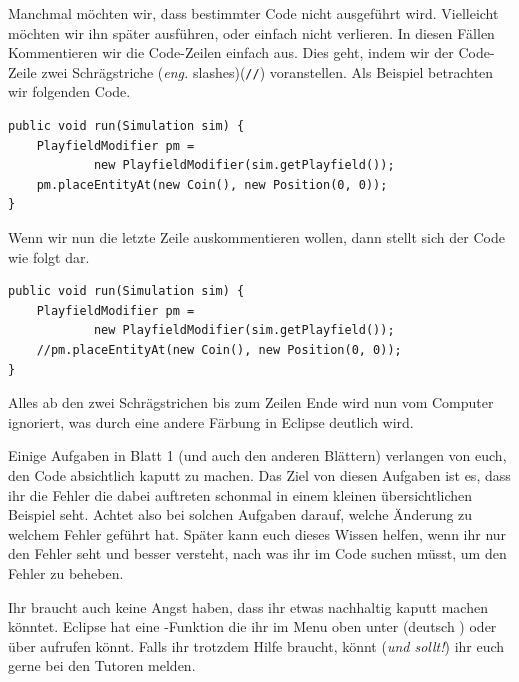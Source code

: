 \begin{Infobox}
    Manchmal möchten wir, dass bestimmter Code nicht ausgeführt wird. Vielleicht möchten wir ihn später ausführen, oder einfach nicht verlieren.
    In diesen Fällen Kommentieren wir die Code-Zeilen einfach aus.
    Dies geht, indem wir der Code-Zeile zwei Schrägstriche (\emph{eng.} slashes)(\lstinline{//}) voranstellen.
    Als Beispiel betrachten wir folgenden Code.\\

    \hfill
    \begin{minipage}{.96\textwidth}
        \begin{lstlisting}
public void run(Simulation sim) {
    PlayfieldModifier pm =
            new PlayfieldModifier(sim.getPlayfield());
    pm.placeEntityAt(new Coin(), new Position(0, 0));
}
        \end{lstlisting}
    \end{minipage}

    Wenn wir nun die letzte Zeile auskommentieren wollen, dann stellt sich der Code wie folgt dar.\\

    \hfill
    \begin{minipage}{.96\textwidth}
        \begin{lstlisting}
public void run(Simulation sim) {
    PlayfieldModifier pm =
            new PlayfieldModifier(sim.getPlayfield());
    //pm.placeEntityAt(new Coin(), new Position(0, 0));
}
        \end{lstlisting}
    \end{minipage}

    Alles ab den zwei Schrägstrichen bis zum Zeilen Ende wird nun vom Computer ignoriert, was durch eine andere Färbung in Eclipse deutlich wird.
\end{Infobox}


\begin{Infobox}[Fehler]
    Einige Aufgaben in Blatt 1 (und auch den anderen Blättern) verlangen von euch, den Code absichtlich kaputt zu machen.
    Das Ziel von diesen Aufgaben ist es, dass ihr die Fehler die dabei auftreten schonmal in einem kleinen übersichtlichen Beispiel seht.
    Achtet also bei solchen Aufgaben darauf, welche Änderung zu welchem Fehler geführt hat.
    Später kann euch dieses Wissen helfen, wenn ihr nur den Fehler seht und besser versteht, nach was ihr im Code suchen müsst, um den Fehler zu beheben.

    Ihr braucht auch keine Angst haben, dass ihr etwas nachhaltig kaputt machen könntet.
    Eclipse hat eine -Funktion die ihr im Menu oben unter  (deutsch ) oder über  aufrufen könnt.
    Falls ihr trotzdem Hilfe braucht, könnt (\emph{und sollt!}) ihr euch gerne bei den Tutoren melden.
\end{Infobox}


